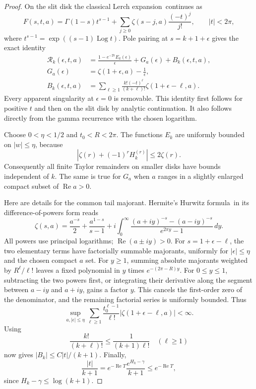 \documentclass[11pt,a4paper]{article}
\numberwithin{equation}{section}
\theoremstyle{definition}
\theoremstyle{remark}
\begin{document}
\begin{proof}
On the slit disk the classical Lerch expansion\,\cite{dlmf-lerch} continues as
\[
 F(s,t,a)=\Gamma(1-s)t^{s-1}
        +\sum_{j\ge0}\zeta(s-j,a)\frac{(-t)^j}{j!},
 \qquad |t|<2\pi,
\]
where $t^{s-1}=\exp((s-1)\operatorname{Log}t)$. Pole pairing at
$s=k+1+\epsilon$ gives the exact identity
\begin{align*}
 \mathcal R_k(\epsilon,t,a)
  &=\frac{1-e^{-T\epsilon}E_k(\epsilon)}\epsilon
      +G_a(\epsilon)+B_k(\epsilon,t,a),\\
 G_a(\epsilon)&=\zeta(1+\epsilon,a)-\frac1\epsilon,\\
 B_k(\epsilon,t,a)
  &=\sum_{\ell\ge1}\frac{k!(-t)^\ell}{(k+\ell)!}
                      \zeta(1+\epsilon-\ell,a).
\end{align*}
Every apparent singularity at $\epsilon=0$ is removable. This identity
first follows for positive $t$ and then on the slit disk by analytic
continuation. It also follows directly from the gamma recurrence with
the chosen logarithm.

Choose $0<\eta<1/2$ and $t_0<R<2\pi$. The functions $E_k$ are uniformly
bounded on $|w|\le\eta$, because
\[
 \left|\zeta(r)+(-1)^rH_k^{(r)}\right|\le2\zeta(r).
\]
Consequently all finite Taylor remainders on smaller disks have bounds
independent of $k$. The same is true for $G_a$ when $a$ ranges in a
slightly enlarged compact subset of $\operatorname{Re}a>0$.

Here are details for the common tail majorant. Hermite's Hurwitz formula\,\cite{dlmf-hurwitz}
in its difference-of-powers form reads
\[
 \zeta(s,a)=\frac{a^{-s}}2+\frac{a^{1-s}}{s-1}
  +i\int_0^\infty
       \frac{(a+iy)^{-s}-(a-iy)^{-s}}{e^{2\pi y}-1}\,dy.
\]
All powers use principal logarithms; $\operatorname{Re}(a\pm iy)>0$.
For $s=1+\epsilon-\ell$, the two elementary terms have factorially
summable majorants, uniformly for $|\epsilon|\le\eta$ and the chosen
compact $a$ set. For $y\ge1$, summing absolute majorants weighted by
$R^\ell/\ell!$ leaves a fixed polynomial in $y$ times
$e^{-(2\pi-R)y}$. For $0\le y\le1$, subtracting the two powers first,
or integrating their derivative along the segment between $a-iy$ and
$a+iy$, gains a factor $y$. This cancels the first-order zero of the
denominator, and the remaining factorial series is uniformly bounded.
Thus
\[
 \sup_{a,|\epsilon|\le\eta}
 \sum_{\ell\ge1}\frac{t_0^{\ell-1}}{\ell!}
                  |\zeta(1+\epsilon-\ell,a)|<\infty.
\]
Using
\[
 \frac{k!}{(k+\ell)!}\le\frac1{(k+1)\ell!}
 \quad(\ell\ge1)
\]
now gives $|B_k|\le C|t|/(k+1)$. Finally,
\[
 \frac{|t|}{k+1}
 =e^{-\operatorname{Re}T}\frac{e^{H_k-\gamma}}{k+1}
 \le e^{-\operatorname{Re}T},
\]
since $H_k-\gamma\le\log(k+1)$.


\end{proof}
\end{document}
